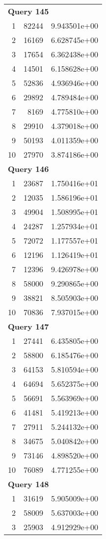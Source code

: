 \begin{longtable}[{p}]{@{}rrp{}@{}}
\midrule
\multicolumn{3}{l}{\bfseries Query 145} \\
1 & 82244 & 9.943501e+00 \\
2 & 16169 & 6.628745e+00 \\
3 & 17654 & 6.362438e+00 \\
4 & 14501 & 6.158628e+00 \\
5 & 52836 & 4.936946e+00 \\
6 & 29892 & 4.789484e+00 \\
7 & 8169 & 4.775810e+00 \\
8 & 29910 & 4.379018e+00 \\
9 & 50193 & 4.011359e+00 \\
10 & 27970 & 3.874186e+00 \\
\midrule
\multicolumn{3}{l}{\bfseries Query 146} \\
1 & 23687 & 1.750416e+01 \\
2 & 12035 & 1.586196e+01 \\
3 & 49904 & 1.508995e+01 \\
4 & 24287 & 1.257934e+01 \\
5 & 72072 & 1.177557e+01 \\
6 & 12196 & 1.126419e+01 \\
7 & 12396 & 9.426978e+00 \\
8 & 58000 & 9.290865e+00 \\
9 & 38821 & 8.505903e+00 \\
10 & 70836 & 7.937015e+00 \\
\midrule
\multicolumn{3}{l}{\bfseries Query 147} \\
1 & 27441 & 6.435805e+00 \\
2 & 58800 & 6.185476e+00 \\
3 & 64153 & 5.810594e+00 \\
4 & 64694 & 5.652375e+00 \\
5 & 56691 & 5.563969e+00 \\
6 & 41481 & 5.419213e+00 \\
7 & 27911 & 5.244132e+00 \\
8 & 34675 & 5.040842e+00 \\
9 & 73146 & 4.898520e+00 \\
10 & 76089 & 4.771255e+00 \\
\midrule
\multicolumn{3}{l}{\bfseries Query 148} \\
1 & 31619 & 5.905009e+00 \\
2 & 58009 & 5.637003e+00 \\
3 & 25903 & 4.912929e+00 \\

\end{longtable}
